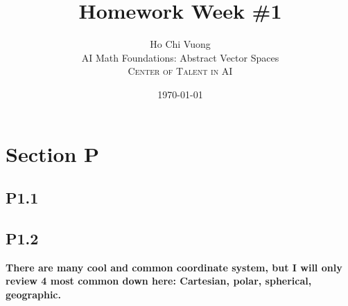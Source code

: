 \documentclass[12pt]{article}
\title{Homework Week \#1} %
\author{Ho Chi Vuong\\ %
AI Math Foundations: Abstract Vector Spaces\\ %
\textsc{Center of Talent in AI}
}
\date{\today} %
\begin{document}
   
\maketitle


\section*{Section P}


\subsection*{P1.1}


\subsection*{P1.2}

{\bfseries There are many cool and common coordinate system, but I will only review 4 most common down here: Cartesian, polar, spherical, geographic.}
\end{document}
